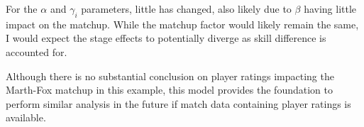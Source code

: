 \indent For the $\alpha$ and $\gamma_i$ parameters, little has changed, also likely due to $\beta$ having little impact on the matchup. While the matchup factor would likely remain the same, I would expect the stage effects to potentially diverge as skill difference is accounted for.

\indent Although there is no substantial conclusion on player ratings impacting the Marth-Fox matchup in this example, this model provides the foundation to perform similar analysis in the future if match data containing player ratings is available.